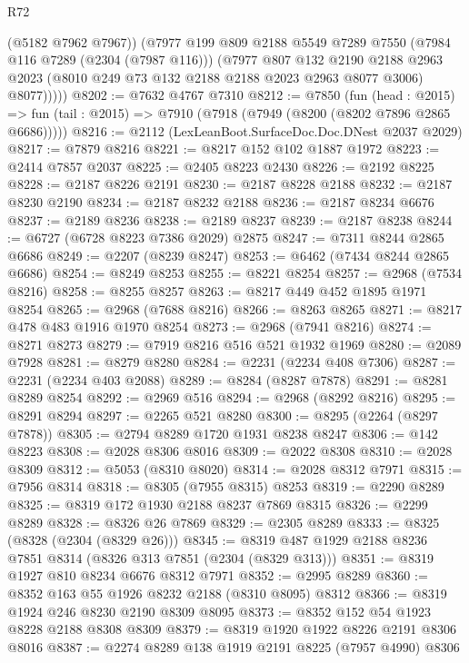 \begin{lexlean}{R72}
\begin{coremodule}
            (@5182 @7962 @7967))
          (@7977
            @199
            @809
            @2188
            @5549
            @7289
            @7550
            (@7984 @116 @7289 (@2304 (@7987 @116)))
            (@7977
              @807
              @132
              @2190
              @2188
              @2963
              @2023
              (@8010 @249 @73 @132 @2188 @2188 @2023 @2963 @8077 @3006)
              @8077)))))
@8202 := @7632 @4767 @7310
@8212 := @7850
    (fun (head : @2015) =>
    fun (tail : @2015) => @7910 (@7918 (@7949 (@8200 (@8202 @7896 @2865 @6686)))))
@8216 := @2112 (LexLeanBoot.SurfaceDoc.Doc.DNest @2037 @2029)
@8217 := @7879 @8216
@8221 := @8217 @152 @102 @1887 @1972
@8223 := @2414 @7857 @2037
@8225 := @2405 @8223 @2430
@8226 := @2192 @8225
@8228 := @2187 @8226 @2191
@8230 := @2187 @8228 @2188
@8232 := @2187 @8230 @2190
@8234 := @2187 @8232 @2188
@8236 := @2187 @8234 @6676
@8237 := @2189 @8236
@8238 := @2189 @8237
@8239 := @2187 @8238
@8244 := @6727 (@6728 @8223 @7386 @2029) @2875
@8247 := @7311 @8244 @2865 @6686
@8249 := @2207 (@8239 @8247)
@8253 := @6462 (@7434 @8244 @2865 @6686)
@8254 := @8249 @8253
@8255 := @8221 @8254
@8257 := @2968 (@7534 @8216)
@8258 := @8255 @8257
@8263 := @8217 @449 @452 @1895 @1971 @8254
@8265 := @2968 (@7688 @8216)
@8266 := @8263 @8265
@8271 := @8217 @478 @483 @1916 @1970 @8254
@8273 := @2968 (@7941 @8216)
@8274 := @8271 @8273
@8279 := @7919 @8216 @516 @521 @1932 @1969
@8280 := @2089 @7928
@8281 := @8279 @8280
@8284 := @2231 (@2234 @408 @7306)
@8287 := @2231 (@2234 @403 @2088)
@8289 := @8284 (@8287 @7878)
@8291 := @8281 @8289 @8254
@8292 := @2969 @516
@8294 := @2968 (@8292 @8216)
@8295 := @8291 @8294
@8297 := @2265 @521 @8280
@8300 := @8295 (@2264 (@8297 @7878))
@8305 := @2794 @8289 @1720 @1931 @8238 @8247
@8306 := @142 @8223
@8308 := @2028 @8306 @8016
@8309 := @2022 @8308
@8310 := @2028 @8309
@8312 := @5053 (@8310 @8020)
@8314 := @2028 @8312 @7971
@8315 := @7956 @8314
@8318 := @8305 (@7955 @8315) @8253
@8319 := @2290 @8289
@8325 := @8319 @172 @1930 @2188 @8237 @7869 @8315
@8326 := @2299 @8289
@8328 := @8326 @26 @7869
@8329 := @2305 @8289
@8333 := @8325 (@8328 (@2304 (@8329 @26)))
@8345 := @8319 @487 @1929 @2188 @8236 @7851 @8314 (@8326 @313 @7851 (@2304 (@8329 @313)))
@8351 := @8319 @1927 @810 @8234 @6676 @8312 @7971
@8352 := @2995 @8289
@8360 := @8352 @163 @55 @1926 @8232 @2188 (@8310 @8095) @8312
@8366 := @8319 @1924 @246 @8230 @2190 @8309 @8095
@8373 := @8352 @152 @54 @1923 @8228 @2188 @8308 @8309
@8379 := @8319 @1920 @1922 @8226 @2191 @8306 @8016
@8387 := @2274 @8289 @138 @1919 @2191 @8225 (@7957 @4990) @8306

\end{coremodule}
\end{lexlean}
